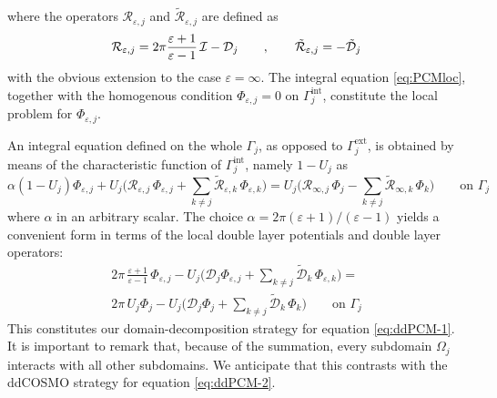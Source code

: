 where the operators ${\mathcal{R}}_{\varepsilon,j}$ and $\tilde{\mathcal{R}}_{\varepsilon,j}$ are defined as
\[
{\mathcal{R}}_{\varepsilon,j} = 2 \pi \frac{\varepsilon + 1}{\varepsilon - 1} \, \mathcal{I} - {\mathcal{D}}_j \qquad , \qquad
\tilde{\mathcal{R}}_{\varepsilon,j} =  - \tilde{\mathcal{D}}_j
\]
with the obvious extension to the case $\varepsilon = \infty$. The integral equation \eqref{eq:PCMloc}, together with the homogenous condition $\Phi_{\varepsilon,j} = 0$ on $\Gamma_j^\text{int}$, constitute the local problem for $\Phi_{\varepsilon,j}$.

An integral equation defined on the whole $\Gamma_j$, as opposed to $\Gamma_j^\text{ext}$, is obtained by means of the characteristic function of $\Gamma_j^\text{int}$, namely $1 - U_j$ as
\[
\alpha(1 - U_j)\Phi_{\varepsilon,j} + U_j \bigg( {\mathcal{R}}_{\varepsilon,j} \, \Phi_{\varepsilon,j} + \sum_{k \ne j} \tilde{\mathcal{R}}_{\varepsilon,k} \, \Phi_{\varepsilon,k}\bigg) = U_j \bigg( {\mathcal{R}}_{\infty,j} \, \Phi_{j} - \sum_{k \ne j} \tilde{\mathcal{R}}_{\infty,k} \, \Phi_{k} \bigg)\qquad \text{on }\Gamma_j
\]
where $\alpha$ in an arbitrary scalar. The choice $\alpha = 2\pi(\varepsilon + 1)/(\varepsilon - 1)$ yields a convenient form in terms of the local double layer potentials and double layer operators:
\begin{multline}\label{eq:1}
2\pi \, \frac{\varepsilon + 1}{\varepsilon - 1} \, \Phi_{\varepsilon,j} - U_j \bigg( {\mathcal{D}}_j \Phi_{\varepsilon,j} + \sum_{k \ne j} \tilde{\mathcal{D}}_{k} \, \Phi_{\varepsilon,k}  \bigg) = \\ 2 \pi \, U_j \Phi_j - U_j \bigg( {\mathcal{D}}_j \Phi_{j} + \sum_{k \ne j} \tilde{\mathcal{D}}_{k} \, \Phi_{k}  \bigg) \qquad \text{on }\Gamma_j
\end{multline}
This constitutes our domain-decomposition strategy for equation \eqref{eq:ddPCM-1}. It is important to remark that, because of the summation, every subdomain $\Omega_j$ interacts with all other subdomains. We anticipate that this contrasts with the ddCOSMO strategy for equation \eqref{eq:ddPCM-2}.

